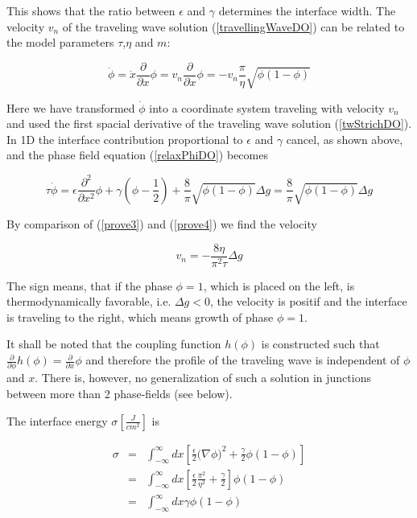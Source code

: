  This shows that the ratio between $\epsilon$ and $\gamma$ determines the interface width. The velocity $v_n$ of the traveling wave solution (\ref{travellingWaveDO}) can be related to the model parameters $\tau$,$\eta$ and $m$:

\begin{equation}
\label{prove3}
  \dot \phi = \dot x \frac {\partial} {\partial x} \phi = v_n \frac {\partial} {\partial x} \phi = - v_n \frac \pi \eta \sqrt{\phi(1-\phi)}
\end{equation}

Here we have transformed $\dot\phi$ into a coordinate system traveling with velocity $v_n$ and used the first spacial derivative of the traveling wave solution (\ref{twStrichDO}). In 1D the interface contribution proportional to $\epsilon$ and $\gamma$ cancel, as shown above, and the phase field equation (\ref{relaxPhiDO}) becomes

\begin{equation}\label{prove4}
  \tau \dot{\phi}  = \epsilon \frac {\partial^2} {\partial x^2} \phi + \gamma(\phi-\frac12) + \frac8\pi\sqrt{\phi(1-\phi)} \Delta g = \frac8\pi\sqrt{\phi(1-\phi)} \Delta g
\end{equation}

By comparison of (\ref{prove3}) and (\ref{prove4}) we find the velocity

\begin{equation}\label{prove5}
  v_n = -\frac {8\eta}{\pi^2\tau} \Delta g
\end{equation}

The sign means, that if the phase $\phi = 1$, which is placed on the left, is thermodynamically favorable, i.e. $\Delta g < 0$, the velocity is positif and the interface is traveling to the right, which means growth of phase $\phi = 1$.

It shall be noted that the coupling function $h(\phi)$ is constructed such that $\frac {\partial} {\partial \phi}h(\phi) = \frac {\partial} {\partial x }\phi$ and therefore the profile of the traveling wave is independent of $\phi$ and $x$. There is, however, no generalization of such a solution in junctions between more than 2 phase-fields (see below).

The interface energy $\sigma [\frac J{cm^2}]$ is

\begin{eqnarray}\label{eindeInterfaceEnergy}
 \nonumber \sigma &=& \int_{-\infty}^{\infty} dx[ \frac {\epsilon}2 {(\nabla\phi})^2 + \frac \gamma 2 \phi (1-\phi)] \\ \nonumber
 &=& \int_{-\infty}^{\infty} dx[\frac \epsilon2 \frac{\pi^2}{\eta^2} + \frac \gamma 2] \phi (1-\phi) \\
 &=& \int_{-\infty}^{\infty} dx \gamma  \phi (1-\phi)
\end{eqnarray}

